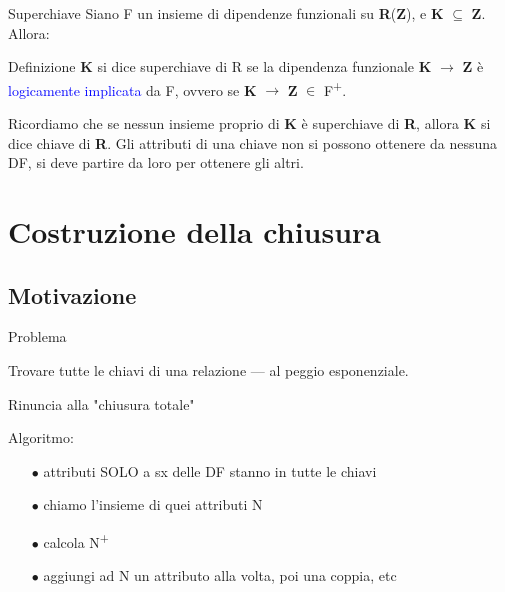 \documentclass{beamer}
\begin{document}
\begin{frame}{Superchiave}
    Siano F un insieme di dipendenze funzionali su \textbf{R}(\textbf{Z}), e \textbf{K} $\subseteq$ \textbf{Z}. Allora:
    \begin{block}{Definizione}
         \textbf{K} si dice superchiave di R se la dipendenza funzionale \textbf{K} $\rightarrow$ \textbf{Z} è \textcolor{blue}{logicamente implicata} da F, ovvero se \textbf{K} $\rightarrow$ \textbf{Z} $\in$ F\textsuperscript{+}.
    \end{block}
    
    \vfill
    Ricordiamo che se nessun insieme proprio di \textbf{K} è superchiave di \textbf{R}, allora \textbf{K} si dice chiave di \textbf{R}. Gli attributi di una chiave non si possono ottenere da nessuna DF, si deve partire da loro per ottenere gli altri.

\end{frame}



\section{Costruzione della chiusura}
\subsection{Motivazione}
\begin{frame}{Problema}
    \begin{block}{}
        Trovare tutte le chiavi di una relazione --- al peggio esponenziale. \par
        Rinuncia alla "chiusura totale"
    \end{block}
    \vfill
    Algoritmo:
    \begin{itemize}
        \item[$\bullet$] attributi SOLO a sx delle DF stanno in tutte le chiavi
        \item[$\bullet$] chiamo l'insieme di quei attributi N
        \item[$\bullet$] calcola N\textsuperscript{+}
        \item[$\bullet$] aggiungi ad N un attributo alla volta, poi una coppia, etc
    \end{itemize}
\end{frame}
\end{document}
